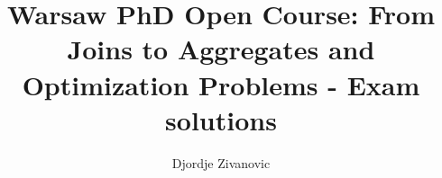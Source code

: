 \documentclass[10pt,a4paper]{article}
\author{Djordje Zivanovic}
\title{\textbf{Warsaw PhD Open Course: From Joins to Aggregates and
Optimization Problems - Exam solutions}}
\begin{document}
\maketitle
\bigskip
\newcommand{\transpose}[1]{#1 ^ \text{T}}
\newcommand{\mat}[1]{\textbf{\text{{#1}}}}
\newcommand{\vect}[1]{\mat{#1}}
\newcommand{\gradient}[1]{\nabla_{\vect{#1}}}
\newcommand{\der}[1]{\frac{\partial}{\partial #1}}
\newcommand{\numberthis}{\addtocounter{equation}{1}\tag{\theequation}}
\newcommand{\logfun}{\sigma(\transpose{\vect{x}}_i \vect{w})}
\newcommand{\softmaxi}{\frac{e^{z_i}}{\sum_{l=1}^Ce^{z_l}}}
\newcommand{\layersep}{2.5cm}
\newcommand{\layersepH}{6cm}
\newcommand{\layersepP}{7cm}
\newcommand{\layersepB}{9cm}
\newtheorem{theorem}{Theorem}
\newtheorem{lemma}[theorem]{Lemma}
\end{document}
